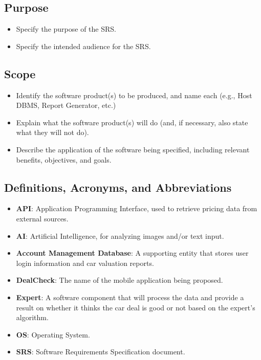 \documentclass[]{article}
\begin{document}
\subsection{Purpose}
\label{sub:purpose}
\begin{itemize}
	\item Specify the purpose of the SRS.
	\item Specify the intended audience for the SRS.
\end{itemize}

\subsection{Scope}
\label{sub:scope}
\begin{itemize}
	\item Identify the software product(s) to be produced, and name each (e.g., Host DBMS, Report Generator, etc.)
	\item Explain what the software product(s) will do (and, if necessary, also state what they will not do).
	\item Describe the application of the software being specified, including relevant benefits, objectives, and goals.
\end{itemize}

\subsection{Definitions, Acronyms, and Abbreviations}
\label{sub:definitions_acronyms_and_abbreviations}
\begin{itemize}
    \item \textbf{API}: Application Programming Interface, used to retrieve pricing data from external sources.
    \item \textbf{AI}: Artificial Intelligence, for analyzing images and/or text input.
    \item \textbf{Account Management Database}: A supporting entity that stores user login information and car valuation reports.
    \item \textbf{DealCheck}: The name of the mobile application being proposed.
    \item \textbf{Expert}: A software component that will process the data and provide a result on whether it thinks the car deal is good or not based on the expert’s algorithm.
    \item \textbf{OS}: Operating System.
    \item \textbf{SRS}: Software Requirements Specification document.
\end{itemize}
\end{document}
